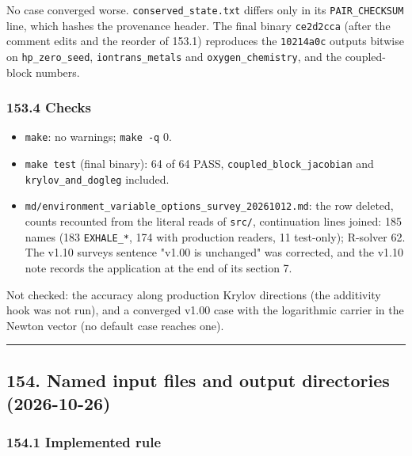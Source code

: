 \documentclass[english,a4paper]{my_memo}
\providecommand{\tightlist}{\setlength{\itemsep}{0pt}\setlength{\parskip}{0pt}}
\begin{document}
No case converged worse. \texttt{conserved\_state.txt} differs only in its \texttt{PAIR\_CHECKSUM} line, which hashes the provenance header. The final binary \texttt{ce2d2cca} (after the comment edits and the reorder of 153.1) reproduces the \texttt{10214a0c} outputs bitwise on \texttt{hp\_zero\_seed}, \texttt{iontrans\_metals} and \texttt{oxygen\_chemistry}, and the coupled-block numbers.

\subsubsection{153.4 Checks}\label{1534-checks}

\begin{itemize}
\tightlist
\item
  \texttt{make}: no warnings; \texttt{make\ -q} 0.
\item
  \texttt{make\ test} (final binary): 64 of 64 PASS, \texttt{coupled\_block\_jacobian} and \texttt{krylov\_and\_dogleg} included.
\item
  \texttt{md/environment\_variable\_options\_survey\_20261012.md}: the row deleted, counts recounted from the literal reads of \texttt{src/}, continuation lines joined: 185 names (183 \texttt{EXHALE\_*}, 174 with production readers, 11 test-only); R-solver 62. The v1.10 survey\textquotesingle s sentence "v1.00 is unchanged" was corrected, and the v1.10 note records the application at the end of its section 7.
\end{itemize}

Not checked: the accuracy along production Krylov directions (the additivity hook was not run), and a converged v1.00 case with the logarithmic carrier in the Newton vector (no default case reaches one).

\begin{center}\rule{0.5\linewidth}{0.5pt}\end{center}

\subsection{154. Named input files and output directories (2026-10-26)}\label{154-named-input-files-and-output-directories-2026-10-26}

\subsubsection{154.1 Implemented rule}\label{1541-implemented-rule}
\end{document}
